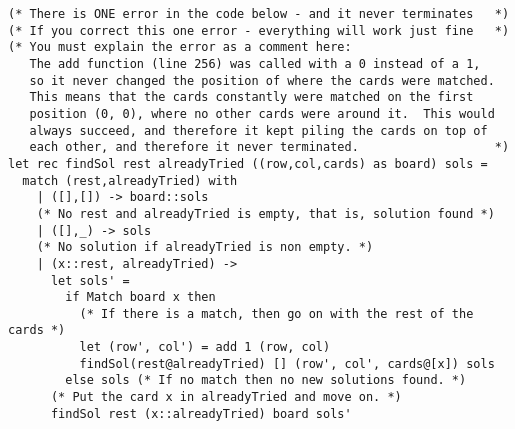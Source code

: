 \begin{lstlisting}
(* There is ONE error in the code below - and it never terminates   *)
(* If you correct this one error - everything will work just fine   *)
(* You must explain the error as a comment here:                   
   The add function (line 256) was called with a 0 instead of a 1, 
   so it never changed the position of where the cards were matched. 
   This means that the cards constantly were matched on the first
   position (0, 0), where no other cards were around it.  This would
   always succeed, and therefore it kept piling the cards on top of
   each other, and therefore it never terminated.                   *)
let rec findSol rest alreadyTried ((row,col,cards) as board) sols =
  match (rest,alreadyTried) with
    | ([],[]) -> board::sols 
	(* No rest and alreadyTried is empty, that is, solution found *)
    | ([],_) -> sols         
	(* No solution if alreadyTried is non empty. *)
    | (x::rest, alreadyTried) ->
      let sols' = 
        if Match board x then
          (* If there is a match, then go on with the rest of the cards *)
          let (row', col') = add 1 (row, col)
          findSol(rest@alreadyTried) [] (row', col', cards@[x]) sols
        else sols (* If no match then no new solutions found. *)
      (* Put the card x in alreadyTried and move on. *)
      findSol rest (x::alreadyTried) board sols'

\end{lstlisting}